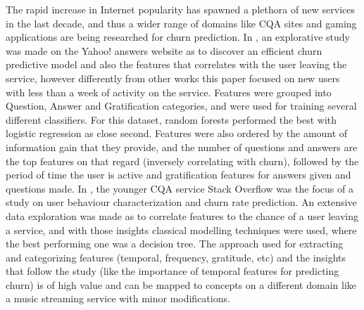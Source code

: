 \documentclass{kththesis}
\begin{document}
The rapid increase in Internet popularity has spawned a plethora of new services in the last decade, and thus a wider range of domains like CQA sites and gaming applications are being researched for churn prediction. In \citep{Dror2012}, an explorative study was made on the Yahoo! answers website as to discover an efficient churn predictive model and also the features that correlates with the user leaving the service, however differently from other works this paper focused on new users with less than a week of activity on the service. Features were grouped into Question, Answer and Gratification categories, and were used for training several different classifiers. For this dataset, random forests performed the best with logistic regression as close second. Features were also ordered by the amount of information gain that they provide, and the number of questions and answers are the top features on that regard (inversely correlating with churn), followed by the period of time the user is active and gratification features for answers given and questions made. In \citep{Pudipeddi2014}, the younger CQA service Stack Overflow was the focus of a study on user behaviour characterization and churn rate prediction. An extensive data exploration was made as to correlate features to the chance of a user leaving a service, and with those insights classical modelling techniques were used, where the best performing one was a decision tree. The approach used for extracting and categorizing features (temporal, frequency, gratitude, etc) and the insights that follow the study (like the importance of temporal features for predicting churn) is of high value and can be mapped to concepts on a different domain like a music streaming service with minor modifications. 
\end{document}
